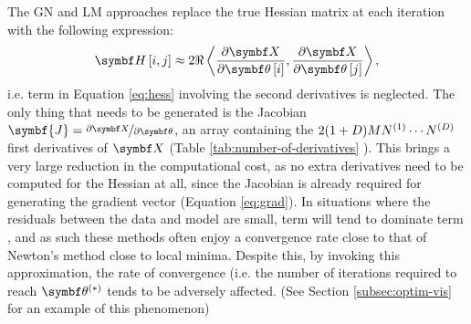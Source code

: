 The \ac{GN} and \ac{LM} approaches replace the true Hessian matrix at each
iteration with the following expression:
\begin{equation}
    \bdH \left[i, j\right] \approx 2 \Re
        \left\langle
            \frac{\partial \bX}{\partial \bth\left[i\right]},
            \frac{\partial \bX}{\partial \bth\left[j\right]}
        \right\rangle,
    \label{eq:hess-approx}
\end{equation}
i.e. term  in Equation \ref{eq:hess} involving the second derivatives is
neglected. The only thing that needs to be generated is the Jacobian
$\symbf{J} = \nicefrac{\partial \bX}{\partial \bth}$, an array containing the
$2(1+D)MN^{(1)}\cdots N^{(D)}$ first derivatives of $\bX$ (Table
\ref{tab:number-of-derivatives} ). This brings a very large reduction in the
computational cost, as no extra derivatives need to be computed for the Hessian
at all, since the Jacobian is already required for generating the gradient
vector (Equation \ref{eq:grad}). In situations where the residuals between the
data and model are small, term  will tend to dominate term
, and as such these methods often enjoy a convergence rate close
to that of Newton's method close to local minima.  Despite this, by invoking
this approximation, the rate of convergence (i.e. the number of iterations
required to reach $\bthstar$ tends to be adversely affected. (See Section
\ref{subsec:optim-vis} for an example of this phenomenon)




